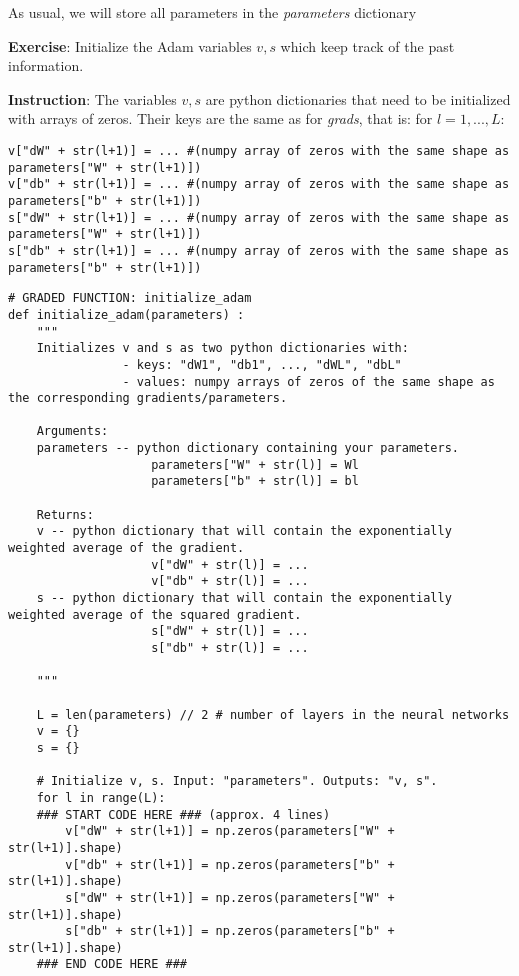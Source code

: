 {As usual, we will store all parameters in the \emph{parameters} dictionary  


{\textbf{Exercise}}: Initialize the Adam variables $v, s$ which keep track of the past information.

{\textbf{Instruction}}: The variables $v, s$ are python dictionaries that need to be initialized with arrays of zeros. Their keys are the same as for \emph{grads}, that is: for $l = 1, ..., L$:
\begin{verbatim}
v["dW" + str(l+1)] = ... #(numpy array of zeros with the same shape as parameters["W" + str(l+1)])
v["db" + str(l+1)] = ... #(numpy array of zeros with the same shape as parameters["b" + str(l+1)])
s["dW" + str(l+1)] = ... #(numpy array of zeros with the same shape as parameters["W" + str(l+1)])
s["db" + str(l+1)] = ... #(numpy array of zeros with the same shape as parameters["b" + str(l+1)])
\end{verbatim}


\begin{verbatim}
# GRADED FUNCTION: initialize_adam
def initialize_adam(parameters) :
    """
    Initializes v and s as two python dictionaries with:
                - keys: "dW1", "db1", ..., "dWL", "dbL" 
                - values: numpy arrays of zeros of the same shape as the corresponding gradients/parameters.
    
    Arguments:
    parameters -- python dictionary containing your parameters.
                    parameters["W" + str(l)] = Wl
                    parameters["b" + str(l)] = bl
    
    Returns: 
    v -- python dictionary that will contain the exponentially weighted average of the gradient.
                    v["dW" + str(l)] = ...
                    v["db" + str(l)] = ...
    s -- python dictionary that will contain the exponentially weighted average of the squared gradient.
                    s["dW" + str(l)] = ...
                    s["db" + str(l)] = ...

    """
    
    L = len(parameters) // 2 # number of layers in the neural networks
    v = {}
    s = {}
    
    # Initialize v, s. Input: "parameters". Outputs: "v, s".
    for l in range(L):
    ### START CODE HERE ### (approx. 4 lines)
        v["dW" + str(l+1)] = np.zeros(parameters["W" + str(l+1)].shape)
        v["db" + str(l+1)] = np.zeros(parameters["b" + str(l+1)].shape)
        s["dW" + str(l+1)] = np.zeros(parameters["W" + str(l+1)].shape)
        s["db" + str(l+1)] = np.zeros(parameters["b" + str(l+1)].shape)
    ### END CODE HERE ###
    

\end{verbatim}}
